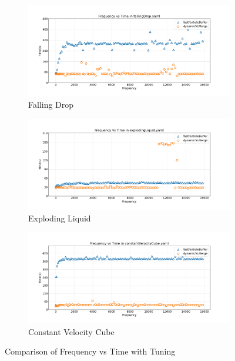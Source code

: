 \begin{figure}[htbp]
    \centering
    \vspace{-0.5em}
    \begin{subfigure}[b]{\textwidth}
        \centering
        \includegraphics[width=0.9\linewidth]{graphs/fallingDrop/freqvstime.png}
        \vspace{-0.5em}
        \caption{\scriptsize Falling Drop}
        \label{fig:tuningfallingDrop}
    \end{subfigure}

    \begin{subfigure}[b]{\textwidth}
        \centering
        \includegraphics[width=0.9\linewidth]{graphs/explodingLiquid/freqvstime.png}
        \vspace{-0.5em}
        \caption{\scriptsize Exploding Liquid}
        \label{fig:tuningexplodingLiquid}
    \end{subfigure}

    \begin{subfigure}[b]{\textwidth}
        \centering
        \includegraphics[width=0.9\linewidth]{graphs/constantVelocityCube/freqvstime.png}
        \vspace{-0.5em}
        \caption{\scriptsize Constant Velocity Cube}
        \label{fig:tuningconstantVelocityCube}
    \end{subfigure}

    \vspace{1em}
    \caption{Comparison of Frequency vs Time with Tuning}
    \label{fig:main}
\end{figure}



